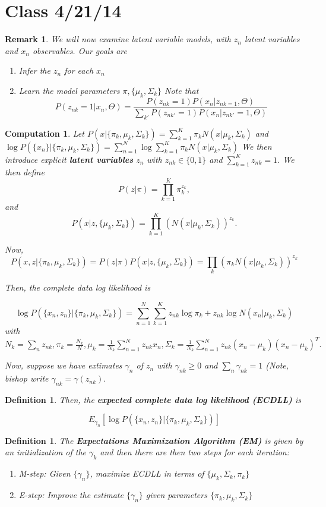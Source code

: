 \documentclass{amsart}
\newtheorem{comp}[subsubsection]{Computation}
\newtheorem{defn}[subsubsection]{Definition}
\newtheorem{rem}[subsubsection]{Remark}
\begin{document}
\section{Class 4/21/14}

\begin{rem}
We will now examine latent variable models, with $z_n$ latent variables and $x_n$ observables. Our goals are \begin{enumerate}
	\item Infer the $z_n$ for each $x_n$
	\item Learn the model parameters $\pi,\{\mu_k,\Sigma_k\}$ Note that $$P(z_{nk} =1|x_n,\Theta) = \frac{P(z_{nk} = 1)P(x_n|z_{nk=1},\Theta)}{\sum_{k'}P(z_{nk'} =1)P(x_n|z_{nk'}=1,\Theta)}$$
\end{enumerate}
\end{rem}

\begin{comp}
Let $P(x| \{\pi_k,\mu_k,\Sigma_k\}) = \sum_{k=1}^K \pi_k N(x|\mu_k,\Sigma_k)$ and $\log P(\{x_n\}| \{\pi_k,\mu_k,\Sigma_k\}) = \sum_{n=1}^N \log \sum_{k=1}^K \pi_k N(x|\mu_k,\Sigma_k)$
We then introduce explicit {\bf latent variables} $z_n$ with $z_{nk} \in \{0,1\}$ and $\sum_{k=1}^K z_{nk} = 1$. We then define $$P(z|\pi) = \prod_{k=1}^K \pi_k^{z_k},$$ and $$P(x|z,\{\mu_k,\Sigma_k\}) = \prod_{k=1}^K (N(x|\mu_k,\Sigma_k))^{z_k}.$$

Now, 
$$P(x,z|\{\pi_k,\mu_k,\Sigma_k\}) = P(z|\pi) P(x|z,\{\mu_k,\Sigma_k\})= \prod_k (\pi_k N(x|\mu_k,\Sigma_k))^{z_k}$$

Then, the complete data log likelihood is

$$\log P(\{x_n,z_n\}|\{\pi_k,\mu_k,\Sigma_k\}) = \sum_{n=1}^N\sum_{k=1}^K z_{nk}\log \pi_k+z_{nk}\log N(x_n|\mu_k,\Sigma_k)$$
with $N_k = \sum_n z_{nk},\pi_k = \frac {N_k}N,\mu_k = \frac{1}{N_k}\sum_{n=1}^N z_{nk} x_n,\Sigma_k = \frac{1}{N_k}\sum_{n=1}^N z_{nk} (x_n-\mu_k)(x_n-\mu_k)^T.$

Now, suppose we have extimates $\gamma_n$ of $z_n$ with $\gamma_{nk} \geq 0$ and $\sum_n \gamma_{nk} = 1$ (Note, bishop write $\gamma_{nk} = \gamma(z_{nk}).$
\end{comp}

\begin{defn}
Then, the {\bf expected complete data log likelihood (ECDLL)} is

$$E_{\gamma_n} \left[\log P(\{x_n,z_n\}|\{\pi_k,\mu_k,\Sigma_k\})\right]$$
\end{defn}
\begin{defn}
The {\bf Expectations Maximization Algorithm (EM)} is given by an initialization of the $\gamma_k$ and then there are then two steps for each iteration: \begin{enumerate}
	\item M-step: Given $\{\gamma_n\}$, maximize ECDLL in terms of $\{\mu_k,\Sigma_k,\pi_k\}$
	\item E-step: Improve the estimate $\{\gamma_n\}$ given parameters $\{\pi_k,\mu_k,\Sigma_k\}$
\end{enumerate}
\end{defn}
\end{document}

